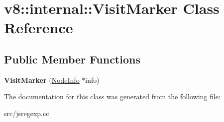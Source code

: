 \hypertarget{classv8_1_1internal_1_1_visit_marker}{}\section{v8\+:\+:internal\+:\+:Visit\+Marker Class Reference}
\label{classv8_1_1internal_1_1_visit_marker}
\subsection*{Public Member Functions}
\begin{DoxyCompactItemize}
\item 
\hypertarget{classv8_1_1internal_1_1_visit_marker_aaab40ec219c01202a8effd592f8922b1}{}{\bfseries Visit\+Marker} (\hyperlink{structv8_1_1internal_1_1_node_info}{Node\+Info} $\ast$info)\label{classv8_1_1internal_1_1_visit_marker_aaab40ec219c01202a8effd592f8922b1}

\end{DoxyCompactItemize}


The documentation for this class was generated from the following file\+:\begin{DoxyCompactItemize}
\item 
src/jsregexp.\+cc\end{DoxyCompactItemize}
